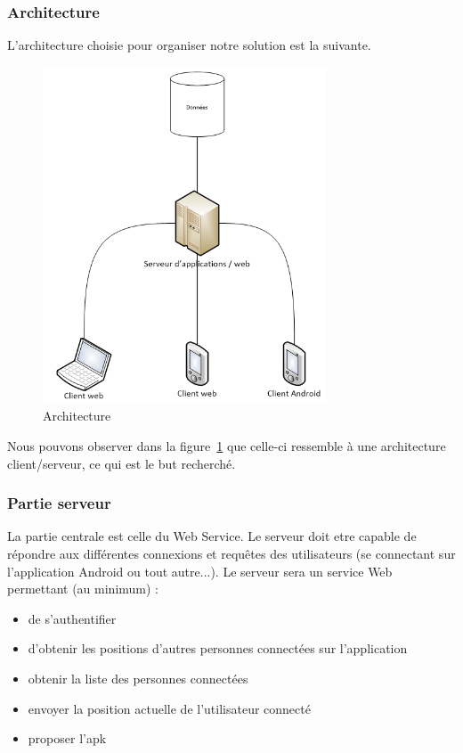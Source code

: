 \subsubsection{Architecture}

L'architecture choisie pour organiser notre solution est la suivante.

\begin{figure}[H]
    \centering
    \includegraphics[height=10cm]{../infrastructure.png}
    \caption{Architecture}
    \label{architecture}
\end{figure}

Nous pouvons observer dans la figure~\ref{architecture} que celle-ci ressemble à une architecture client/serveur, ce qui est le but recherché.

\subsubsection{Partie serveur}
La partie centrale est celle du Web Service. Le serveur doit etre capable de répondre aux différentes connexions et requêtes des utilisateurs (se connectant sur l'application Android ou tout autre...). Le serveur sera un service Web permettant (au minimum) :
\begin{itemize}
    \item de s'authentifier
    \item d'obtenir les positions d'autres personnes connectées sur l'application
    \item obtenir la liste des personnes connectées
    \item envoyer la position actuelle de l'utilisateur connecté
    \item proposer l'apk
\end{itemize}

